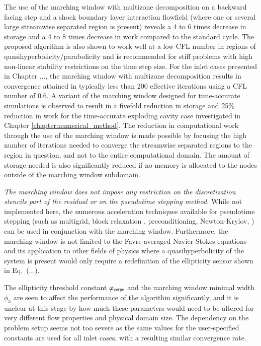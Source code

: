 The use of the marching window with multizone decomposition
on a backward facing step and a shock boundary
layer interaction flowfield (where one or several large streamwise separated region
is present) reveals a 4 to 6 times decrease in storage and a 4 to 8 times
decrease in work compared to the standard cycle.
The proposed algorithm is also shown to work well at
a low CFL number in regions of quasihyperbolicity/parabolicity
and is recommended for stiff
problems with high non-linear stability restrictions on the time step size.
For the inlet cases presented in Chapter ..., the marching window
with multizone decomposition results in convergence attained in typically less than
200 effective iterations using a CFL number of 0.6.
A variant of the marching window designed for time-accurate simulations
is observed to result in a fivefold reduction in storage and 25\% reduction in work
for the time-accurate exploding cavity case investigated in Chapter
\ref{chapter:numerical_method}.
The reduction in computational work through the use of the marching window
is made possible by focusing the
high number of iterations needed to converge the streamwise
separated regions to the region in question, and not to the
entire computational domain. The amount of storage needed is also significantly
reduced if no memory is allocated to the nodes outside of the marching window subdomain.


\emph{The marching window does not impose any restriction
on the discretization stencils part of the residual or on the pseudotime
stepping method.}  While not implemented here,
the numerous acceleration techniques available for pseudotime
stepping (such as multigrid, block relaxation \cite{aiaa:2000:denicola},
preconditioning, Newton-Krylov, \etc) can be used in conjunction with
the marching window.
Furthermore, the marching window is not limited to the Favre-averaged
Navier-Stokes equations and its application to other fields of physics
where a quasihyperbolicity of the system is present would only
require a redefinition of the ellipticity sensor shown in Eq.~(...).


The ellipticity threshold constant ${\varphi_{\rm verge}}$ and the marching window
minimal width $\phi_3$ are seen to affect the performance of the algorithm
significantly, and it is unclear at this stage by how much these
parameters would need to be altered for very different flow properties and physical domain size.
The dependency on the problem setup seems not too severe as the same
values for the user-specified constants are used for all inlet cases, with a resulting
similar convergence rate.



